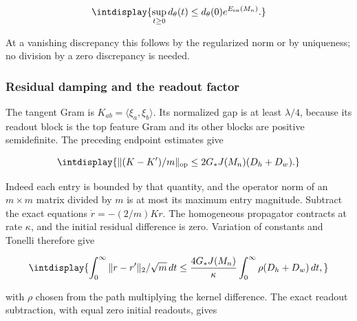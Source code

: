 \begingroup\renewcommand{\theHequation}{intdisplay.463}
\begin{equation*}
\intdisplay{
\sup_{t\ge0}d_\theta(t)\le d_\theta(0)e^{E_{\mathrm{en}}(M_n)}.
}
\end{equation*}
\endgroup


At a vanishing discrepancy this follows by the regularized norm or by uniqueness; no division by a zero discrepancy is needed.


\subsubsection{Residual damping and the readout factor}



The tangent Gram is \(K_{ab}=\langle\xi_a,\allowbreak \xi_b\rangle\). Its normalized gap is at least \(\lambda/4\), because its readout block is the top feature Gram and its other blocks are positive semidefinite. The preceding endpoint estimates give


\begingroup\renewcommand{\theHequation}{intdisplay.464}
\begin{equation*}
\intdisplay{
\|(K-K')/m\|_{\rm op}\le2G_*J(M_n)(D_h+D_w).
}
\end{equation*}
\endgroup


Indeed each entry is bounded by that quantity, and the operator norm of an \(m\times m\) matrix divided by \(m\) is at most its maximum entry magnitude. Subtract the exact equations \(\dot r=-(2/m)Kr\). The homogeneous propagator contracts at rate \(\kappa\), and the initial residual difference is zero. Variation of constants and Tonelli therefore give


\begingroup\renewcommand{\theHequation}{intdisplay.465}
\begin{equation*}
\intdisplay{
\int_0^\infty\|r-r'\|_2/\sqrt m\,dt
\le\frac{4G_*J(M_n)}{\kappa}
\int_0^\infty\rho(D_h+D_w)\,dt,
}
\end{equation*}
\endgroup


with \(\rho\) chosen from the path multiplying the kernel difference. The exact readout subtraction, with equal zero initial readouts, gives



